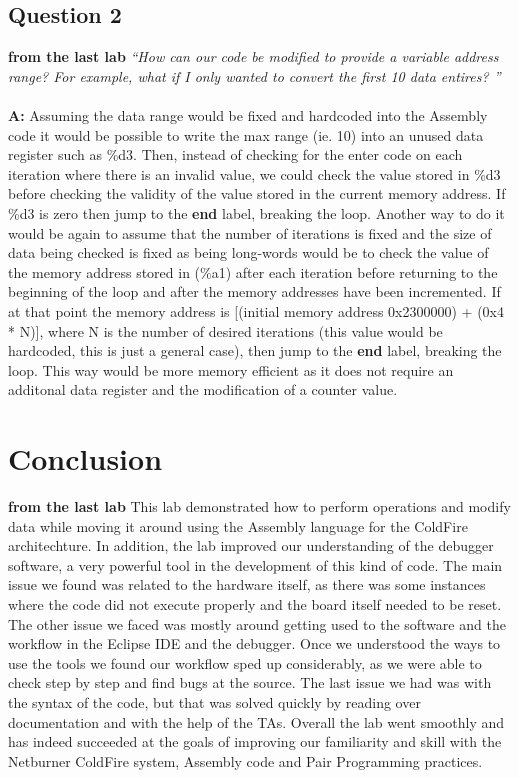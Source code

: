 \documentclass[letterpaper]{article}
\begin{document}
    \subsection{Question 2}
    \textbf{from the last lab}
      \textit{``How can our code be modified to provide a variable address range? For example, what if I only wanted to convert the first 10 data entires? ''}
      \\ \\
      \noindent\textbf{A:}
      Assuming the data range would be fixed and hardcoded into the Assembly code it would be possible to
      write the max range (ie. 10) into an unused data register such as \%d3.  Then, instead of checking
      for the enter code on each iteration where there is an invalid value, we could check the value stored in
      \%d3 before checking the validity of the value stored in the current memory address.  If \%d3 is
      zero then jump to the \textbf{end} label, breaking the loop.  Another way to do it would be again
      to assume that the number of iterations is fixed and the size of data being checked is fixed as being
      long-words would be to check the value of the memory address stored in (\%a1) after each iteration
      before returning to the beginning of the loop and after the memory addresses have been incremented.
      If at that point the memory address is [(initial memory address 0x2300000) + (0x4 * N)], where N is
      the number of desired iterations (this value would be hardcoded, this is just a general case), then
      jump to the \textbf{end} label, breaking the loop.  This way would be more memory efficient as it
      does not require an additonal data register and the modification of a counter value.

\section{Conclusion}
\textbf{from the last lab}
  This lab demonstrated how to perform operations
  and modify data while moving it around using the Assembly language for the ColdFire architechture.
  In addition, the lab improved our understanding of the debugger software, a very powerful
  tool in the development of this kind of code.  The main issue we found was related
  to the hardware itself, as there was some instances where the code did not execute
  properly and the board itself needed to be reset.  The other issue we faced was mostly
  around getting used to the software and the workflow in the Eclipse IDE and
  the debugger.  Once we understood the ways to use the tools we found our workflow sped up
  considerably, as we were able to check step by step and find bugs at the source.  The last
  issue we had was with the syntax of the code, but that was solved quickly by reading over
  documentation and with the help of the TAs.  Overall the lab went smoothly and has indeed
  succeeded at the goals of improving our familiarity and skill with the Netburner ColdFire system,
  Assembly code and Pair Programming practices.
\end{document}
